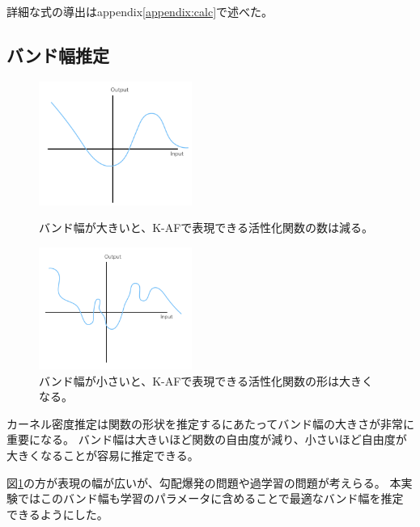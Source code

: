 詳細な式の導出はappendix\ref{appendix:calc}で述べた。


\subsection{バンド幅推定}


\begin{figure}[hbtp]
    \begin{center}
            \begin{minipage}{0.40\hsize}
                \includegraphics[width=5cm]{asset/k_af_band_big.png}
                    \caption{バンド幅が大きいと、K-AFで表現できる活性化関数の数は減る。}
                    \label{k_af_band_big}
            \end{minipage}
            \begin{minipage}{0.40\hsize}
            \hspace{10pt}
                \includegraphics[width=5cm]{asset/k_af_band_small.png}
                    \caption{バンド幅が小さいと、K-AFで表現できる活性化関数の形は大きくなる。}
                    \label{k_af_band_small}
            \end{minipage}
    \end{center}
\end{figure}


カーネル密度推定は関数の形状を推定するにあたってバンド幅の大きさが非常に重要になる。
バンド幅は大きいほど関数の自由度が減り、小さいほど自由度が大きくなることが容易に推定できる。

図\ref{k_af_band_small}の方が表現の幅が広いが、勾配爆発の問題や過学習の問題が考えらる。
本実験ではこのバンド幅も学習のパラメータに含めることで最適なバンド幅を推定できるようにした。

